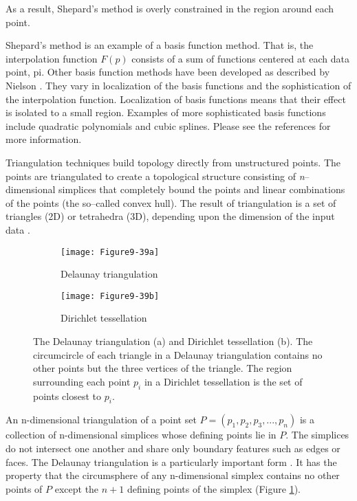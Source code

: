 \begin{description}[leftmargin=0cm,labelindent=0cm]
As a result, Shepard's method is overly constrained in the region around each point.

Shepard's method is an example of a basis function method. That is, the interpolation function $F(p)$ consists of a sum of functions centered at each data point, pi. Other basis function methods have been developed as described by Nielson \cite{Nielson91a}. They vary in localization of the basis functions and the sophistication of the interpolation function. Localization of basis functions means that their effect is isolated to a small region. Examples of more sophisticated basis functions include quadratic polynomials and cubic splines. Please see the references for more information.

\item[Triangulation techniques.]

Triangulation techniques build topology directly from unstructured points. The points are triangulated to create a topological structure consisting of \emph{n}--dimensional simplices that completely bound the points and linear combinations of the points (the so--called convex hull). The result of triangulation is a set of triangles (2D) or tetrahedra (3D), depending upon the dimension of the input data \cite{Lawson86}.

\begin{figure}[htb]
    \centering
	\begin{subfigure}[h]{0.48\linewidth}
		\texttt{[image: Figure9-39a]}
		\captionsetup{justification=centering}
		\caption{Delaunay triangulation}
		\label{fig:Figure9-39a}
	\end{subfigure}
	\hfill
	\begin{subfigure}[h]{0.48\linewidth}
		\texttt{[image: Figure9-39b]}
		\captionsetup{justification=centering}
		\caption{Dirichlet tessellation}
		\label{fig:Figure9-39b}
	\end{subfigure}
	\caption{The Delaunay triangulation (a) and Dirichlet tessellation (b). The circumcircle of each triangle in a Delaunay triangulation contains no other points but the three vertices of the triangle. The region surrounding each point $p_i$ in a Dirichlet tessellation is the set of points closest to $p_i$.}\label{fig:Figure9-39}
\end{figure}

An n-dimensional triangulation of a point set $P = (p_1, p_2, p_3, ..., p_n)$ is a collection of n-dimensional simplices whose defining points lie in $P$. The simplices do not intersect one another and share only boundary features such as edges or faces. The Delaunay triangulation is a particularly important form \cite{Bowyer81} \cite{Watson81}. It has the property that the circumsphere of any n-dimensional simplex contains no other points of $P$ except the $n+1$ defining points of the simplex (Figure \ref{fig:Figure9-39a}).


\end{description}
